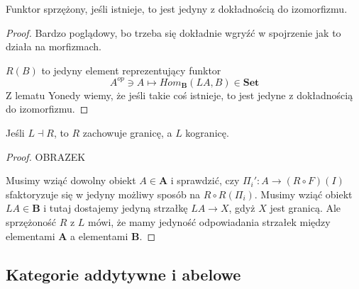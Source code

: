 \begin{fact}
  Funktor sprzężony, jeśli istnieje, to jest jedyny z dokładnością do izomorfizmu.
\end{fact}

\begin{proof}
  Bardzo poglądowy, bo trzeba się dokładnie wgryźć w spojrzenie jak to działa na morfizmach.

  $R(B)$ to jedyny element reprezentujący funktor
  $$A^{op}\ni A\mapsto Hom_{\mathbf{B}}(LA,B)\in\mathbf{Set}$$
    Z lematu Yonedy wiemy, że jeśli takie coś istnieje, to jest jedyne z dokładnością do izomorfizmu.
\end{proof}

\begin{fact}
  Jeśli $L\dashv R$, to $R$ zachowuje granicę, a $L$ kogranicę.
\end{fact}

\begin{proof}
  {\large\color{red}OBRAZEK}

  Musimy wziąć dowolny obiekt $A\in \mathbf{A}$ i sprawdzić, czy $\Pi_i':A\to (R\circ F)(I)$ sfaktoryzuje się w jedyny możliwy sposób na $R\circ R(\Pi_i)$. Musimy wziąć obiekt $LA\in\mathbf{B}$ i tutaj dostajemy jedyną strzałkę $LA\to X$, gdyż $X$ jest granicą. Ale sprzężoność $R$ z $L$ mówi, że mamy jedyność odpowiadania strzałek między elementami $\mathbf{A}$ a elementami $\mathbf{B}$.
\end{proof}

\subsection{Kategorie addytywne i abelowe}

